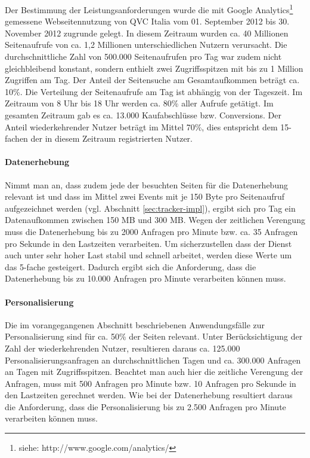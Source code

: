 Der Bestimmung der Leistungsanforderungen wurde die mit Google Analytics\footnote{siehe: http://www.google.com/analytics/} gemessene Webseitennutzung von QVC Italia vom 01. September 2012 bis 30. November 2012 zugrunde gelegt. In diesem Zeitraum wurden ca. 40 Millionen Seitenaufrufe von ca. 1,2 Millionen unterschiedlichen Nutzern verursacht. Die durchschnittliche Zahl von 500.000 Seitenaufrufen pro Tag war zudem nicht gleichbleibend konstant, sondern enthielt zwei Zugriffsspitzen mit bis zu 1 Million Zugriffen am Tag. Der Anteil der Seitensuche am Gesamtaufkommen beträgt ca. 10\%. Die Verteilung der Seitenaufrufe am Tag ist abhängig von der Tageszeit. Im Zeitraum von 8 Uhr bis 18 Uhr werden ca. 80\% aller Aufrufe getätigt. Im gesamten Zeitraum gab es ca. 13.000 Kaufabschlüsse bzw. Conversions. Der Anteil wiederkehrender Nutzer beträgt im Mittel 70\%, dies entspricht dem 15-fachen der in diesem Zeitraum registrierten Nutzer. %

\paragraph{Datenerhebung} Nimmt man an, dass zudem jede der besuchten Seiten für die Datenerhebung relevant ist und dass im Mittel zwei Events mit je 150 Byte pro Seitenaufruf aufgezeichnet werden (vgl. Abschnitt \ref{sec:tracker-impl}), ergibt sich pro Tag ein Datenaufkommen zwischen 150 MB und 300 MB. Wegen der zeitlichen Verengung muss die Datenerhebung bis zu 2000 Anfragen pro Minute bzw. ca. 35 Anfragen pro Sekunde in den Lastzeiten verarbeiten. Um sicherzustellen dass der Dienst auch unter sehr hoher Last stabil und schnell arbeitet, werden diese Werte um das 5-fache gesteigert. Dadurch ergibt sich die Anforderung, dass die Datenerhebung bis zu 10.000 Anfragen pro Minute verarbeiten können muss.

\paragraph{Personalisierung} Die im vorangegangenen Abschnitt beschriebenen Anwendungsfälle zur Personalisierung sind für ca. 50\% der Seiten relevant. Unter Berücksichtigung der Zahl der wiederkehrenden Nutzer, resultieren daraus ca. 125.000 Personalisierungsanfragen an durchschnittlichen Tagen und ca. 300.000 Anfragen an Tagen mit Zugriffsspitzen. Beachtet man auch hier die zeitliche Verengung der Anfragen, muss mit 500 Anfragen pro Minute bzw. 10 Anfragen pro Sekunde in den Lastzeiten gerechnet werden. Wie bei der Datenerhebung resultiert daraus die Anforderung, dass die Personalisierung bis zu 2.500 Anfragen pro Minute verarbeiten können muss. %


